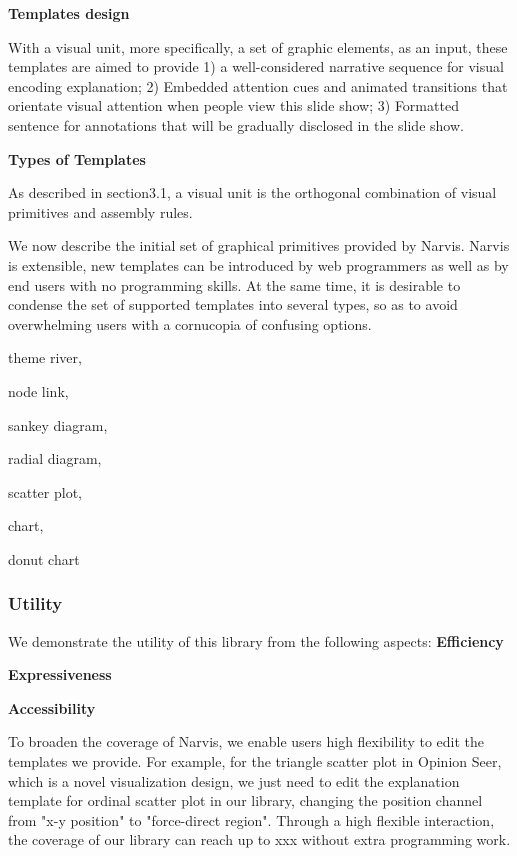 \textbf{Templates design}

With a visual unit, more specifically, a set of graphic elements, as an input, these templates are aimed to provide 1) a well-considered narrative sequence for visual encoding explanation; 2) Embedded attention cues and animated transitions that orientate visual attention  when people view this slide show; 3) Formatted sentence for annotations that will be gradually disclosed in the slide show. 

\textbf{Types of Templates}

As described in section3.1, a visual unit is the orthogonal combination of visual primitives and assembly rules.   

We now describe the initial set of graphical primitives provided by Narvis. Narvis is extensible, new templates can be introduced by web programmers as well as by end users with no programming skills. At the same time, it is desirable to condense the set of supported templates into several types, so as to avoid overwhelming users with a cornucopia of confusing options.\par
theme river, \par
node link, \par
sankey diagram, \par
radial diagram,\par
scatter plot,\par 
chart,\par
donut chart\par
\subsubsection{Utility}
We demonstrate the utility of this library from the following aspects:
\textbf{Efficiency}\par
\textbf{Expressiveness}\par
\textbf{Accessibility}\par
To broaden the coverage of Narvis, we enable users high flexibility to edit the templates we provide. For example, for the triangle scatter plot in Opinion Seer\cite{wu_opinionseer:_2010}, which is a novel visualization design, we just need to edit the explanation template for ordinal scatter plot in our library, changing the position channel from "x-y position" to "force-direct region".  
Through a high flexible interaction, the coverage of our library can reach up to xxx  without extra programming work. 


